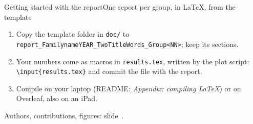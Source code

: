 %
\begin{frame}{Getting started with the report}{One report per group, in \LaTeX{}, from the template}
  \small
  \begin{enumerate}\setlength{\itemsep}{8pt}
    \item \alert{Copy the template folder} in \texttt{doc/} to \texttt{report\_FamilynameYEAR\_TwoTitleWords\_Group<NN>}; keep its sections.
    \item Your numbers come as \alert{macros} in \texttt{results.tex}, written by the plot script: \texttt{\textbackslash input\{results.tex\}} and commit the file with the report.
    \item Compile on your laptop (README: \emph{Appendix: compiling \LaTeX}) or on \alert{Overleaf}, also on an iPad.
  \end{enumerate}

  \vfill
  {\footnotesize Authors, contributions, figures: slide~\pageref{app:report-template}.}
\end{frame}
